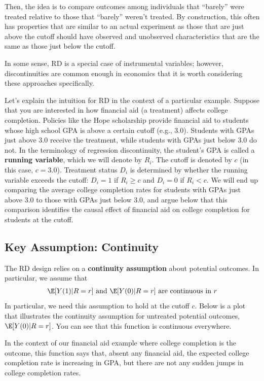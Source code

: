 \documentclass[
  letterpaper,
  DIV=11,
  numbers=noendperiod]{scrreprt}
\begin{document}
Then, the idea is to compare outcomes among individuals that ``barely''
were treated relative to those that ``barely'' weren't treated. By
construction, this often has properties that are similar to an actual
experiment as those that are just above the cutoff should have observed
and unobserved characteristics that are the same as those just below the
cutoff.

In some sense, RD is a special case of instrumental variables; however,
discontinuities are common enough in economics that it is worth
considering these approaches specifically.

Let's explain the intuition for RD in the context of a particular
example. Suppose that you are interested in how financial aid (a
treatment) affects college completion. Policies like the Hope
scholarship provide financial aid to students whose high school GPA is
above a certain cutoff (e.g., 3.0). Students with GPAs just above 3.0
receive the treatment, while students with GPAs just below 3.0 do not.
In the terminology of regression discontinuity, the student's GPA is
called a \textbf{running variable}, which we will denote by \(R_i\). The
cutoff is denoted by \(c\) (in this case, \(c = 3.0\)). Treatment status
\(D_i\) is determined by whether the running variable exceeds the
cutoff: \(D_i = 1\) if \(R_i \geq c\) and \(D_i = 0\) if \(R_i < c\). We
will end up comparing the average college completion rates for students
with GPAs just above 3.0 to those with GPAs just below 3.0, and argue
below that this comparison identifies the causal effect of financial aid
on college completion for students at the cutoff.

\subsection{Key Assumption: Continuity}\label{key-assumption-continuity}

The RD design relies on a \textbf{continuity assumption} about potential
outcomes. In particular, we assume that \begin{align*}
  \E[Y(1) | R = r] \text{ and } \E[Y(0) | R = r] \text{ are continuous in } r
\end{align*} In particular, we need this assumption to hold at the
cutoff \(c\). Below is a plot that illustrates the continuity assumption
for untreated potential outcomes, \(\E[Y(0)|R=r]\). You can see that
this function is continuous everywhere.

In the context of our financial aid example where college completion is
the outcome, this function says that, absent any financial aid, the
expected college completion rate is increasing in GPA, but there are not
any sudden jumps in college completion rates.
\end{document}
